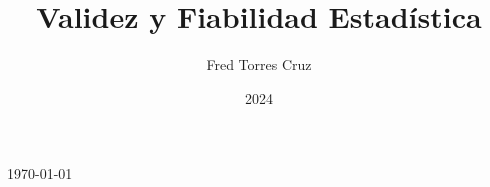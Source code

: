 \documentclass[12pt,a4,oneside]{book}
\begin{document}
\title{Validez y Fiabilidad Estadística}
\author{Fred Torres Cruz}
\date{2024}

\begin{titlepage}
     \vspace{15cm}
     \today
\end{titlepage}


 













\end{document}
